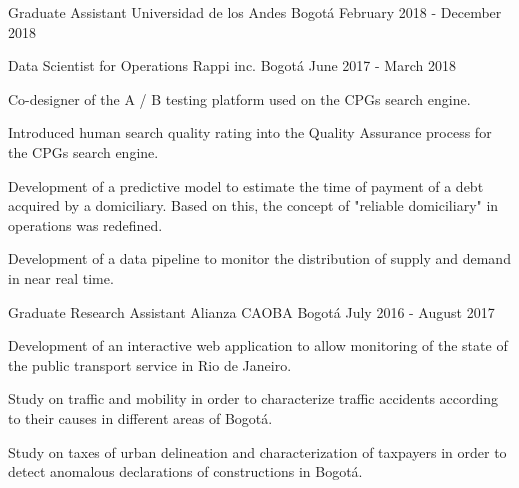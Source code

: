 


\begin{cventries}
    \cventry
    {Graduate Assistant}
    {Universidad de los Andes}
    {Bogotá}
    {February 2018 - December 2018}
    {
    }

    \cventry
    {Data Scientist for Operations} %
    {Rappi inc.} %
    {Bogotá} %
    {June 2017 - March 2018} %
    {
        \begin{cvitems}
        \item{Co-designer of the A / B testing platform used on the CPGs search engine.}
        \item{Introduced human search quality rating into the Quality Assurance process for the CPGs search engine.}
        \item{Development of a predictive model to estimate the time of payment of a debt acquired by a domiciliary. Based on this, the concept of "reliable domiciliary" in operations was redefined.}
        \item{Development of a data pipeline to monitor the distribution of supply and demand in near real time.}
        \end{cvitems}
    } %


    \cventry
    {Graduate Research Assistant} %
    {Alianza CAOBA} %
    {Bogotá} %
    {July 2016 - August 2017} %
    {
        \begin{cvitems}
        \item{Development of an interactive web application to allow monitoring of the state of the public transport service in Rio de Janeiro.}
        \item{Study on traffic and mobility in order to characterize traffic accidents according to their causes in different areas of Bogotá.}
        \item{Study on taxes of urban delineation and characterization of taxpayers in order to detect anomalous declarations of constructions in Bogotá.}
        \end{cvitems}
    } %


    \vspace{-0.5cm}
\end{cventries}
